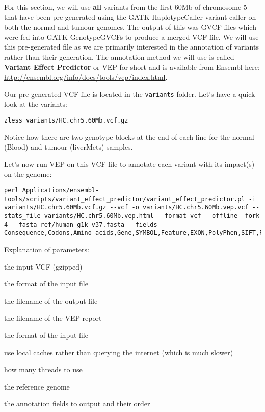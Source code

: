 For this section, we will use \textbf{all} variants from the first 60Mb of chromosome 5 that have been pre-generated using the GATK HaplotypeCaller variant caller on both the normal and tumour genomes. The output of this was GVCF files which were fed into GATK GenotypeGVCFs to produce a merged VCF file. We will use this pre-generated file as we are primarily interested in the annotation of variants rather than their generation. The annotation method we will use is called \textbf{Variant Effect Predictor} or VEP for short and is available from Ensembl here: \url{http://ensembl.org/info/docs/tools/vep/index.html}.\\

\begin{steps}
Our pre-generated VCF file is located in the \texttt{variants} folder. Let's have a quick look at the variants:
\begin{lstlisting}
zless variants/HC.chr5.60Mb.vcf.gz
\end{lstlisting}
\end{steps}

Notice how there are two genotype blocks at the end of each line for the normal (Blood) and tumour (liverMets) samples.\\

\begin{steps}
Let's now run VEP on this VCF file to annotate each variant with its impact(s) on the genome:
\begin{lstlisting}[breaklines=true,breakatwhitespace=false]
perl Applications/ensembl-tools/scripts/variant_effect_predictor/variant_effect_predictor.pl -i variants/HC.chr5.60Mb.vcf.gz --vcf -o variants/HC.chr5.60Mb.vep.vcf --stats_file variants/HC.chr5.60Mb.vep.html --format vcf --offline -fork 4 --fasta ref/human_g1k_v37.fasta --fields Consequence,Codons,Amino_acids,Gene,SYMBOL,Feature,EXON,PolyPhen,SIFT,Protein_position,BIOTYPE
\end{lstlisting}
\end{steps}

\newpage

Explanation of parameters:
\begin{note}
\begin{description}[style=multiline,labelindent=0cm,align=right,leftmargin=\descriptionlabelspace,rightmargin=1.5cm,font=\ttfamily]
 \item[-i] the input VCF (gzipped)
 \item[--vcf] the format of the input file
 \item[-o] the filename of the output file
 \item[--stats\_file] the filename of the VEP report
 \item[--format] the format of the input file
 \item[--offline] use local caches rather than querying the internet (which is much slower)
 \item[-fork] how many threads to use
 \item[--fasta] the reference genome
 \item[--fields] the annotation fields to output and their order
\end{description}
\end{note}

